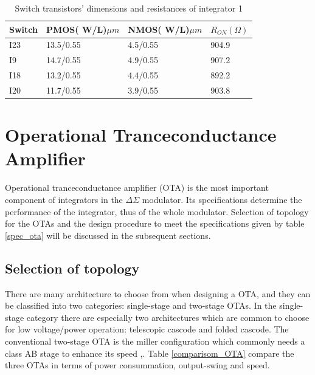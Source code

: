 \begin{table}[ht]
\centering
\caption{Switch transistors' dimensions and resistances of integrator 1}
\label{R_on_1}
\begin{tabular}{|l|l|l|l|}
\hline
Switch & PMOS( W/L)$\mu m$ & NMOS( W/L)$\mu m$ & $R_{ON} (\Omega)$   \\ \hline
I23    & 13.5/0.55  & 4.5/0.55   & 904.9 \\ \hline
I9     & 14.7/0.55  & 4.9/0.55   & 907.2 \\ \hline
I18    & 13.2/0.55  & 4.4/0.55   & 892.2 \\ \hline
I20    & 11.7/0.55  & 3.9/0.55   & 903.8 \\ \hline
\end{tabular}
\end{table}

\section{Operational Tranceconductance Amplifier}

Operational tranceconductance amplifier (OTA) is the most important component of integrators in the $\Delta\Sigma$ modulator. Its specifications determine the performance of the integrator, thus of the whole modulator. Selection of topology for the OTAs and the design procedure to meet the specifications given by table \ref{spec_ota} will be discussed in the subsequent sections. 

\subsection{Selection of topology}
There are many architecture to choose from when designing a OTA, and they can be classified into two categories: single-stage and two-stage OTAs. In the single-stage category there are especially two architectures which are common to choose for low voltage/power operation: telescopic cascode and folded cascode. The conventional two-stage OTA is the miller configuration which commonly needs a class AB stage to enhance its speed \cite{two_stage_1},\cite{two_stage_2}. Table \ref{comparisom_OTA} compare the three OTAs in terms of power consummation, output-swing and speed.

